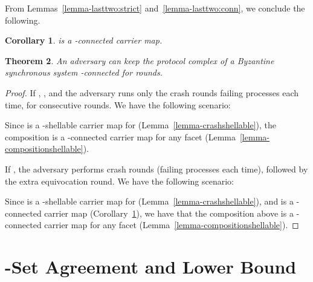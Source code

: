 \documentclass[11pt]{article}
\newtheorem{theorem}{Theorem}[section]
\newtheorem{corollary}[theorem]{Corollary}
\begin{document}
From Lemmas~\ref{lemma-lasttwo:strict} and~\ref{lemma-lasttwo:conn},
we conclude the following.
\begin{corollary}
\label{corollary-lasttwo:conn}
 is a -connected carrier map.
\end{corollary}

\begin{theorem}
An adversary can keep the protocol complex of a Byzantine synchronous system -connected
for  rounds.
\end{theorem}
\begin{proof}
If ,
,
and the adversary runs only the crash rounds failing  processes each time,
for  consecutive rounds.
We have the following scenario:

Since  is a -shellable carrier map
for  (Lemma~\ref{lemma-crashshellable}),
the composition 
is a -connected carrier map for any facet 
(Lemma~\ref{lemma-compositionshellable}).

If ,
the adversary performs  crash rounds (failing  processes each time),
followed by the extra equivocation round.
We have the following scenario:

Since  is a -shellable carrier map
for  (Lemma~\ref{lemma-crashshellable}),
and  is a -connected carrier map
(Corollary~\ref{corollary-lasttwo:conn}),
we have that the composition above 
is a -connected carrier map for any facet 
(Lemma~\ref{lemma-compositionshellable}).
\end{proof}

\section{-Set Agreement and Lower Bound}
\label{Sec-KSetLowerBound}
\end{document}
